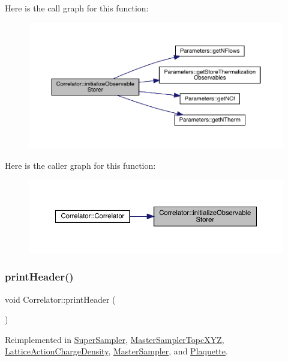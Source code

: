 Here is the call graph for this function\+:\nopagebreak
\begin{figure}[H]
\begin{center}
\leavevmode
\includegraphics[width=350pt]{class_correlator_ab99886c09dd27dfc8676d0032cecf9bc_cgraph}
\end{center}
\end{figure}
Here is the caller graph for this function\+:\nopagebreak
\begin{figure}[H]
\begin{center}
\leavevmode
\includegraphics[width=350pt]{class_correlator_ab99886c09dd27dfc8676d0032cecf9bc_icgraph}
\end{center}
\end{figure}
\mbox{\label{class_correlator_ac7c5a07d7cbee97c417a1659b93083b2}} 
\subsubsection{\texorpdfstring{printHeader()}{printHeader()}}
{\footnotesize\ttfamily void Correlator\+::print\+Header (\begin{DoxyParamCaption}{ }\end{DoxyParamCaption})\hspace{0.3cm}{\ttfamily [virtual]}}



Reimplemented in \mbox{\hyperlink{class_super_sampler_a9bedfcc40a22c48378a6ed63f64e6957}{Super\+Sampler}}, \mbox{\hyperlink{class_master_sampler_topc_x_y_z_a630a504ecbf3ceb517ebeefb39c3faff}{Master\+Sampler\+Topc\+X\+YZ}}, \mbox{\hyperlink{class_lattice_action_charge_density_a2a7a806862f23975161316a37f47f22e}{Lattice\+Action\+Charge\+Density}}, \mbox{\hyperlink{class_master_sampler_a51b207672764c100e1ae258fd2e33fcf}{Master\+Sampler}}, and \mbox{\hyperlink{class_plaquette_aef85b75fe7ce4780eeacf96c5da1b4b4}{Plaquette}}.


